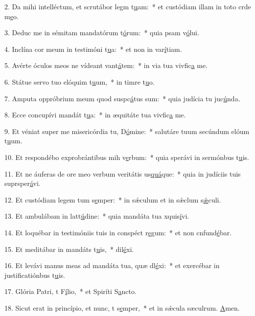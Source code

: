 2. Da mihi intelléctum, et scrutábor legm t\uline{u}am:~* et custódiam illam in toto crde m\uline{e}o.\par 
3. Deduc me in sémitam mandatórum t\uline{ó}rum:~* quia psam v\uline{ó}lui.\par 
4. Inclína cor meum in testimóni t\uline{u}a:~* et non in var\uline{í}tiam.\par 
5. Avérte óculos meos ne vídeant vant\uline{á}tem:~* in via tua vivfic\uline{a} me.\par 
6. Státue servo tuo elóquim t\uline{u}um,~* in timre t\uline{u}o.\par 
7. Amputa oppróbrium meum quod suspc\uline{á}tus sum:~* quia judícia tu juc\uline{ú}nda.\par 
8. Ecce concupívi mandát t\uline{u}a:~* in æquitáte tua vivfic\uline{a} me.\par 
9. Et véniat super me misericórdia tu, D\uline{ó}mine:~* salutáre tuum secúndum elóum t\uline{u}um.\par 
10. Et respondébo exprobrántibus mih v\uline{e}rbum:~* quia sperávi in sermónbus t\uline{u}is.\par 
11. Et ne áuferas de ore meo verbum veritátis us\uline{quá}que:~* quia in judíciis tuis suprsper\uline{á}vi.\par 
12. Et custódiam legem tum s\uline{e}mper:~* in sǽculum et in sǽclum s\uline{ǽ}culi.\par 
13. Et ambulábam in latt\uline{ú}dine:~* quia mandáta tua xquis\uline{í}vi.\par 
14. Et loquébar in testimóniis tuis in conspéct r\uline{e}gum:~* et non cnfund\uline{é}bar.\par 
15. Et meditábar in mandáts t\uline{u}is,~*  dil\uline{é}xi.\par 
16. Et levávi manus meas ad mandáta tua, quæ dl\uline{é}xi:~* et exercébar in justificatiónbus t\uline{u}is.\par 
17. Glória Patri, t F\uline{í}lio,~* et Spiríti S\uline{a}ncto.\par 
18. Sicut erat in princípio, et nunc, t s\uline{e}mper,~* et in sǽcula sæculrum. \uline{A}men.\par 
